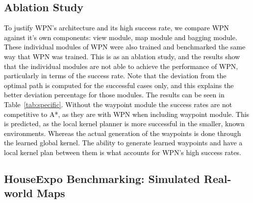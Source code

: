 \documentclass[journal, twocolumn]{IEEEtran}
\begin{document}
\subsection{Ablation Study} \label{sec:ablation}
\textcolor{black}{To justify WPN's architecture and its high success rate, we compare WPN against it's own components: view module, map module and bagging module. 
%
These individual modules of WPN were also trained and benchmarked the same way that WPN was trained. This is as an ablation study, and the results show that the individual modules are not able to achieve the performance of WPN, particularly in terms of the success rate. Note that the deviation from the optimal path is computed for the successful cases only, and this explains the better deviation percentage for those modules. 
%
The results can be seen in Table~\ref{tab:specific}. Without the waypoint module the success rates are not competitive to A*, as they are with WPN when including  waypoint module. This is predicted, as the local kernel planner is more successful in the smaller, known environments. Whereas the actual generation of the waypoints is done through the learned global kernel. The ability to generate learned waypoints and have a local kernel plan between them is what accounts for WPN's high success rates. }


\subsection{HouseExpo Benchmarking: Simulated Real-world Maps}
\end{document}
